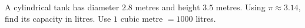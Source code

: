 A cylindrical tank has diameter $2.8$ metres and height $3.5$ metres. Using $\pi\approx3.14$, find its capacity in litres. Use $1$ cubic metre $=1000$ litres.
